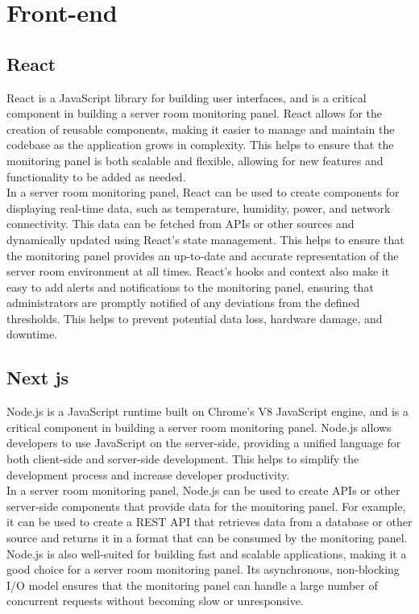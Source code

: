 \section{Front-end}
    \subsection{React}
    React is a JavaScript library for building user interfaces, and is a critical component in building a server room monitoring panel. React allows for the creation of reusable components, making it easier to manage and maintain the codebase as the application grows in complexity. This helps to ensure that the monitoring panel is both scalable and flexible, allowing for new features and functionality to be added as needed.\\
    In a server room monitoring panel, React can be used to create components for displaying real-time data, such as temperature, humidity, power, and network connectivity. This data can be fetched from APIs or other sources and dynamically updated using React's state management. This helps to ensure that the monitoring panel provides an up-to-date and accurate representation of the server room environment at all times. React's hooks and context also make it easy to add alerts and notifications to the monitoring panel, ensuring that administrators are promptly notified of any deviations from the defined thresholds. This helps to prevent potential data loss, hardware damage, and downtime.
    \subsection{Next js}
    Node.js is a JavaScript runtime built on Chrome's V8 JavaScript engine, and is a critical component in building a server room monitoring panel. Node.js allows developers to use JavaScript on the server-side, providing a unified language for both client-side and server-side development. This helps to simplify the development process and increase developer productivity.\\
    In a server room monitoring panel, Node.js can be used to create APIs or other server-side components that provide data for the monitoring panel. For example, it can be used to create a REST API that retrieves data from a database or other source and returns it in a format that can be consumed by the monitoring panel.\\
    Node.js is also well-suited for building fast and scalable applications, making it a good choice for a server room monitoring panel. Its asynchronous, non-blocking I/O model ensures that the monitoring panel can handle a large number of concurrent requests without becoming slow or unresponsive.
